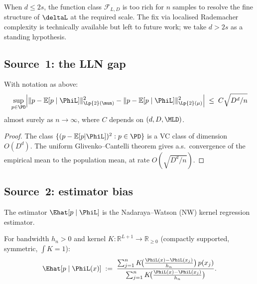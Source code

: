 \begin{remark}
\label{III:rem:d>2s}
When $d \leq 2s$, the function class $\mathcal{F}_{L,D}$ is too rich for
$n$ samples to resolve the fine structure of $\deltaL$ at the required scale.
The fix via localised Rademacher complexity \cite{BartlettBousquetMendelson2005}
is technically available but left to future work; we take $d > 2s$ as
a standing hypothesis.
\end{remark}

\subsection{Source~1: the LLN gap}
\label{III:subsec:source1}

\begin{lemma}
\label{III:lem:source1}
With notation as above:
\[
  \sup_{p \in \PD}
  \Bigl|
    \|p - \mathbb{E}[p \mid \PhiL]\|_{\Lp{2}(\mun)}^2
    - \|p - \mathbb{E}[p \mid \PhiL]\|_{\Lp{2}(\mu)}^2
  \Bigr|
  \;\leq\; C\sqrt{D^d/n}
\]
almost surely as $n \to \infty$, where $C$ depends on $(d,D,\MLD)$.
\end{lemma}

\begin{proof}
The class $\{(p - \mathbb{E}[p|\PhiL])^2 : p \in \PD\}$ is a VC class
of dimension $O(D^d)$.
The uniform Glivenko--Cantelli theorem \cite{Gyorfi2002} gives a.s.\ convergence
of the empirical mean to the population mean, at rate $O(\sqrt{D^d/n})$.
\end{proof}

\subsection{Source~2: estimator bias}
\label{III:subsec:source2}

The estimator $\Ehat[p \mid \PhiL]$ is the Nadaraya--Watson (NW) kernel
regression estimator.

\begin{definition}
\label{III:def:nw}
For bandwidth $h_n > 0$ and kernel $K : \mathbb{R}^{L+1} \to \mathbb{R}_{\geq 0}$
(compactly supported, symmetric, $\int K = 1$):
\[
  \Ehat[p \mid \PhiL(x)]
  \;:=\;
  \frac{\sum_{j=1}^n K\!\bigl(\tfrac{\PhiL(x)-\PhiL(x_j)}{h_n}\bigr)\,p(x_j)}%
       {\sum_{j=1}^n K\!\bigl(\tfrac{\PhiL(x)-\PhiL(x_j)}{h_n}\bigr)}.
\]
\end{definition}

